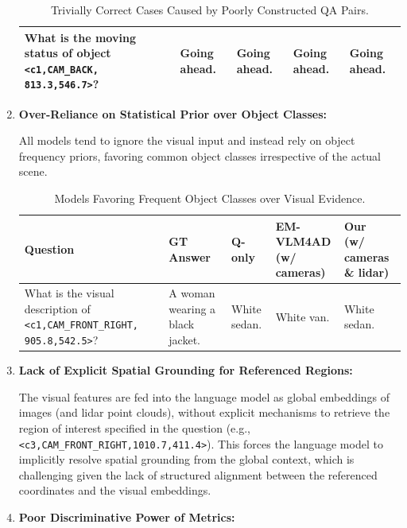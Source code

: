 \documentclass{article} %
\begin{document}
\begin{enumerate}
\begin{table}[htbp]
\begin{tabular}{|p{4.2cm}|p{2.3cm}|p{2.3cm}|p{2.5cm}|p{3.0cm}|}
        \hline
        What is the moving status of object \texttt{<c1,CAM\_BACK,} \texttt{813.3,546.7>}? & Going ahead. & Going ahead. & Going ahead. & Going ahead. \\
        \hline
    \end{tabular}
    \caption{Trivially Correct Cases Caused by Poorly Constructed QA Pairs.}
    \label{tab:collision_responses}
\end{table}
    \item \textbf{Over-Reliance on Statistical Prior over Object Classes:}

    All models tend to ignore the visual input and instead rely on object frequency priors,  favoring common object classes irrespective of the actual scene.
\begin{table}[htbp]
    \centering
    \begin{tabular}{|p{4.2cm}|p{2.3cm}|p{2.3cm}|p{2.5cm}|p{3.0cm}|}
        \hline
        \textbf{Question} & \textbf{GT Answer} & \textbf{Q-only} & \makecell{\textbf{EM-VLM4AD}\\(w/ cameras)} & \makecell{\textbf{Our}\\(w/ cameras \& lidar)} \\
        \hline
        What is the visual description of \texttt{<c1,CAM\_FRONT\_RIGHT,} \texttt{905.8,542.5>}? & A woman wearing a black jacket. & White sedan. & White van. & White sedan. \\
        \hline
    \end{tabular}
    \caption{Models Favoring Frequent Object Classes over Visual Evidence.}
    \label{tab:collision_responses}
\end{table}
    \item \textbf{Lack of Explicit Spatial Grounding for Referenced Regions:}
    
    The visual features are fed into the language model as global embeddings of images (and lidar point clouds), without explicit mechanisms to retrieve the region of interest specified in the question (e.g., \texttt{<c3,CAM\_FRONT\_RIGHT,1010.7,411.4>}). This forces the language model to implicitly resolve spatial grounding from the global context, which is challenging given the lack of structured alignment between the referenced coordinates and the visual embeddings.
    \item \textbf{Poor Discriminative Power of Metrics:}
    

\end{enumerate}
\end{document}

